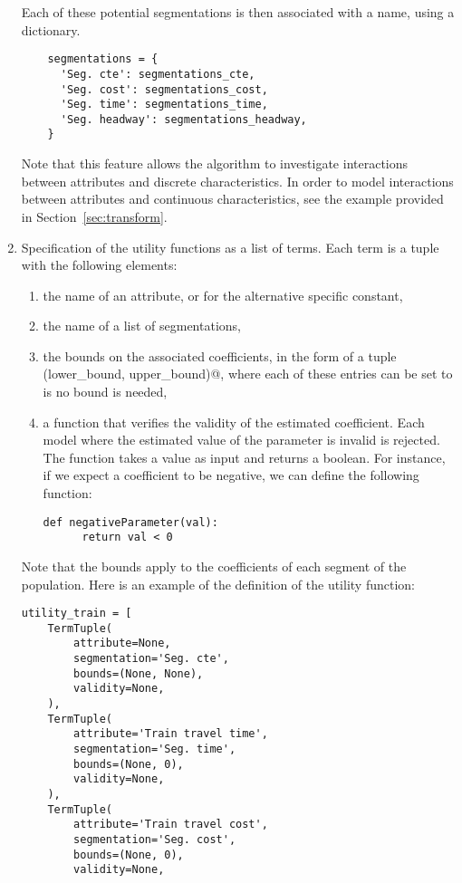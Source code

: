 \documentclass[12pt,a4paper]{article}
\begin{document}
\begin{enumerate}
  Each of these potential segmentations is then associated with a name,
  using a dictionary.
  \begin{lstlisting}
    segmentations = {
      'Seg. cte': segmentations_cte,
      'Seg. cost': segmentations_cost,
      'Seg. time': segmentations_time,
      'Seg. headway': segmentations_headway,
    }
  \end{lstlisting}
Note that this feature allows the algorithm to investigate interactions between
attributes and discrete characteristics. In order to model
interactions between attributes and continuous characteristics, see
the example provided in Section~\ref{sec:transform}.  
\item \label{item:util}Specification of the utility functions as a list of
  terms. Each term is a tuple with the following elements:
  \begin{enumerate}
  \item the name of an attribute, or \lstinline@None@ for the
    alternative specific constant,
  \item the name of a list of segmentations,
  \item the bounds on the associated coefficients, in the form of
    a tuple \lstinline@(lower_bound, upper_bound)@, where each of
    these entries can be set to \lstinline@None@ is no bound is
    needed,
  \item a function that verifies the validity of the estimated
    coefficient. Each model where the estimated value of the
    parameter is invalid is rejected. The function takes a value as input and returns
    a boolean. For instance, if we expect a coefficient to be
    negative, we can define the following function:
    \begin{lstlisting}
def negativeParameter(val):
      return val < 0
    \end{lstlisting}
  \end{enumerate}
  Note that the bounds apply to the coefficients of
  each segment of the population.  Here is an example of the definition
  of the utility function:
  \begin{lstlisting}
utility_train = [
    TermTuple(
        attribute=None,
        segmentation='Seg. cte',
        bounds=(None, None),
        validity=None,
    ),
    TermTuple(
        attribute='Train travel time',
        segmentation='Seg. time',
        bounds=(None, 0),
        validity=None,
    ),
    TermTuple(
        attribute='Train travel cost',
        segmentation='Seg. cost',
        bounds=(None, 0),
        validity=None,

\end{lstlisting}
\end{enumerate}
\end{document}
